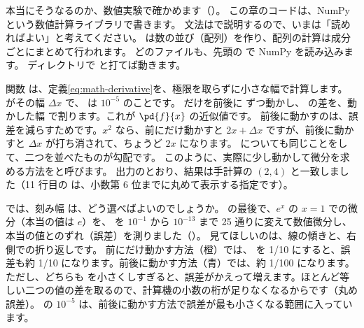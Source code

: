 本当にそうなるのか、数値実験で確かめます（）。
この章のコードは、NumPy という数値計算ライブラリで書きます。
文法はで説明するので、いまは「読めればよい」と考えてください。
 は数の並び（配列）を作り、配列の計算は成分ごとにまとめて行われます。
どのファイルも、先頭の  で NumPy を読み込みます。 ディレクトリで  と打てば動きます。


関数  は、定義\eqref{eq:math-derivative}を、極限を取らずに小さな幅で計算します。
 がその幅 $\Delta x$ で、 は $10^{-5}$ のことです。
 だけを前後に  ずつ動かし、 の差を、動かした幅  で割ります。これが $\pd{f}{x}$ の近似値です。
前後に動かすのは、誤差を減らすためです。$x^{2}$ なら、前にだけ動かすと $2x+\Delta x$ ですが、前後に動かすと $\Delta x$ が打ち消されて、ちょうど $2x$ になります。
 についても同じことをして、二つを並べたものが勾配です。
このように、実際に少し動かして微分を求める方法をと呼びます。
出力のとおり、結果は手計算の $(2,4)$ と一致しました（11 行目の  は、小数第 6 位までに丸めて表示する指定です）。

では、刻み幅  は、どう選べばよいのでしょうか。
 の最後で、$e^{x}$ の $x=1$ での微分（本当の値は $e$）を、 を $10^{-1}$ から $10^{-13}$ まで 25 通りに変えて数値微分し、本当の値とのずれ（誤差）を測りました（）。
見てほしいのは、線の傾きと、右側での折り返しです。
前にだけ動かす方法（橙）では、 を 1/10 にすると、誤差も約 1/10 になります。前後に動かす方法（青）では、約 1/100 になります。
ただし、どちらも  を小さくしすぎると、誤差がかえって増えます。ほとんど等しい二つの値の差を取るので、計算機の小数の桁が足りなくなるからです（丸め誤差）。
の $10^{-5}$ は、前後に動かす方法で誤差が最も小さくなる範囲に入っています。

